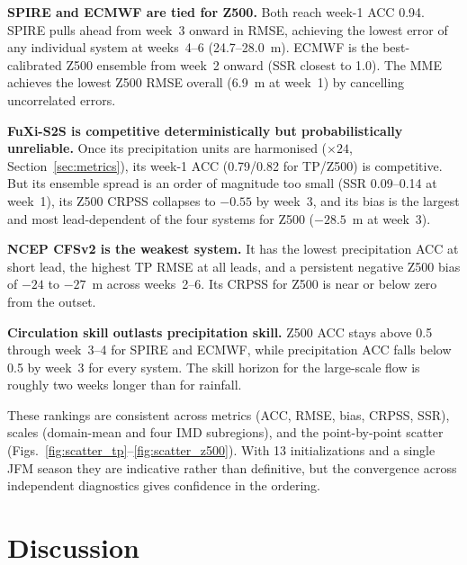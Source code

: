 \documentclass[11pt]{article}
\begin{document}
\textbf{SPIRE and ECMWF are tied for Z500.} Both reach week-1 ACC 0.94.
SPIRE pulls ahead from week~3 onward in RMSE, achieving the lowest error
of any individual system at weeks~4--6 (24.7--28.0~m). ECMWF is the
best-calibrated Z500 ensemble from week~2 onward (SSR closest to 1.0).
The MME achieves the lowest Z500 RMSE overall (6.9~m at week~1) by
cancelling uncorrelated errors.

\textbf{FuXi-S2S is competitive deterministically but probabilistically
unreliable.} Once its precipitation units are harmonised ($\times24$,
Section~\ref{sec:metrics}), its week-1 ACC (0.79/0.82 for TP/Z500) is
competitive. But its ensemble spread is an order of magnitude too small
(SSR 0.09--0.14 at week~1), its Z500 CRPSS collapses to $-0.55$ by
week~3, and its bias is the largest and most lead-dependent of the four
systems for Z500 ($-28.5$~m at week~3).

\textbf{NCEP CFSv2 is the weakest system.} It has the lowest
precipitation ACC at short lead, the highest TP RMSE at all leads, and
a persistent negative Z500 bias of $-24$ to $-27$~m across weeks~2--6.
Its CRPSS for Z500 is near or below zero from the outset.

\textbf{Circulation skill outlasts precipitation skill.} Z500 ACC stays
above 0.5 through week~3--4 for SPIRE and ECMWF, while precipitation
ACC falls below 0.5 by week~3 for every system. The skill horizon for
the large-scale flow is roughly two weeks longer than for rainfall.

These rankings are consistent across metrics (ACC, RMSE, bias, CRPSS,
SSR), scales (domain-mean and four IMD subregions), and the
point-by-point scatter (Figs.~\ref{fig:scatter_tp}--\ref{fig:scatter_z500}). With 13
initializations and a single JFM season they are indicative rather than
definitive, but the convergence across independent diagnostics gives
confidence in the ordering.


\section{Discussion}\label{sec:discussion}
\end{document}
